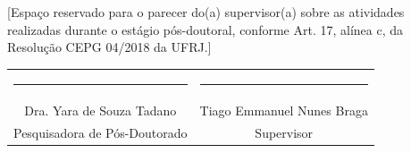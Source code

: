 {[Espa\c{c}o reservado para o parecer do(a) supervisor(a) sobre as atividades realizadas durante o est\'agio p\'os-doutoral, conforme Art. 17, al\'inea c, da Resolu\c{c}\~ao CEPG 04/2018 da UFRJ.]}

\vspace{3cm}

\begin{center}
\begin{tabular}{c@{\hskip 2cm}c}
\rule{6cm}{0.4pt} & \rule{6cm}{0.4pt} \\
Dra. Yara de Souza Tadano & {Tiago Emmanuel Nunes Braga} \\
Pesquisadora de P\'os-Doutorado & Supervisor \\
\end{tabular}

\end{center}
